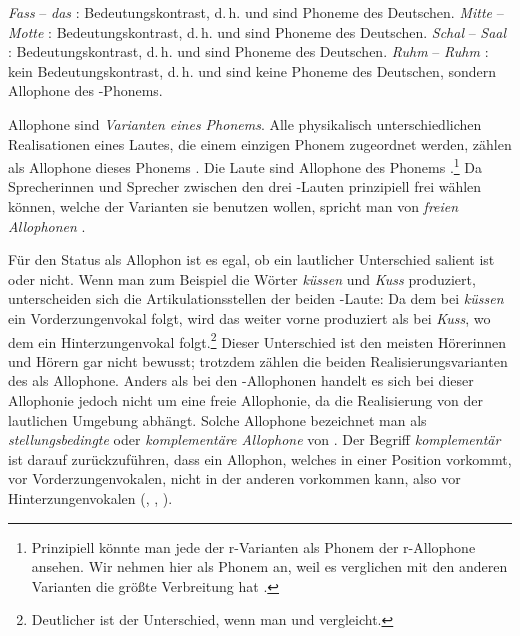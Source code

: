 \ea \label{ea:Minimalpaaranalyse}
\ea \label{ea:Fassdas} \textit{Fass} \textipa{[fas]} -- \textit{das} \textipa{[das]}: Bedeutungskontrast, d.\,h.  und  sind Phoneme des Deutschen.
\ex \label{ex:MitteMotte} \textit{Mitte} \textipa{[\textprimstress mI\.*t@]} -- \textit{Motte} \textipa{[\textprimstress mO\.*t@]}: Bedeutungskontrast, d.\,h.  und  sind Phoneme des Deutschen.
\ex \label{ex:Schal-Saal} \textit{Schal} \textipa{[Sa:l]} -- \textit{Saal} \textipa{[za:l]}: Bedeutungskontrast, d.\,h.  und  sind Phoneme des Deutschen.
\ex \label{ex:Ruhm} \textit{Ruhm} \textipa{[ru:m]} -- \textit{Ruhm} \textipa{[Ku:m]}: kein Bedeutungskontrast, d.\,h. \textipa{[r]} und \textipa{[K]} sind keine Phoneme des Deutschen, sondern Allophone des -Phonems.
\z 
\z 



Allophone sind \textit{Varianten eines Phonems}. Alle physikalisch unterschiedlichen Realisationen eines Lautes, die einem einzigen Phonem zugeordnet werden, zählen als Allophone dieses Phonems \citep[18]{Katamba1996}. Die Laute \textipa{[r, \;R, K]} sind Allophone des Phonems .\footnote{Prinzipiell könnte man jede der r-Varianten als Phonem der r-Allophone ansehen. Wir nehmen hier  als Phonem an, weil es verglichen mit den anderen Varianten die größte Verbreitung hat \citep[52]{DudenAussprache2023}.} Da Sprecherinnen und Sprecher zwischen den drei -Lauten prinzipiell frei wählen können, welche der Varianten sie benutzen wollen, spricht man von \textit{freien Allophonen} \citep[42--43]{Ramers1998}.

Für den Status als Allophon ist es egal, ob ein lautlicher Unterschied salient ist oder nicht. Wenn man zum Beispiel die Wörter \textit{küssen} und \textit{Kuss} produziert, unterscheiden sich die Artikulationsstellen der beiden -Laute: Da dem \textipa{[k]} bei \textit{küssen} ein Vorderzungenvokal folgt, wird das \textipa{[k]} weiter vorne produziert als bei \textit{Kuss}, wo dem \textipa{[k]} ein Hinterzungenvokal folgt.\footnote{Deutlicher ist der Unterschied, wenn man \textipa{[ki]} und \textipa{[ku]} vergleicht.} Dieser Unterschied ist den meisten Hörerinnen und Hörern gar nicht bewusst; trotzdem zählen die beiden Realisierungsvarianten des  als Allophone. Anders als bei den -Allophonen handelt es sich bei dieser Allophonie jedoch nicht um eine freie Allophonie, da die Realisierung von der lautlichen Umgebung abhängt. Solche Allophone bezeichnet man als \textit{stellungsbedingte} oder \textit{komplementäre Allophone} von . Der Begriff \textit{komplementär} ist darauf zurückzuführen, dass ein Allophon, welches in einer Position vorkommt, \zB vor Vorderzungenvokalen, nicht in der anderen vorkommen kann, also vor Hinterzungenvokalen (\cite[38--39]{Hall2000}, \cite[46--49]{Ramers1998}, \cite[18]{Lass2000}).


